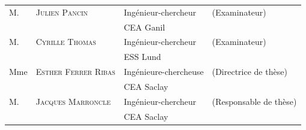 \begin{titlepage}
\begin{textblock}{14}
\begin{center}
\begin{tabular}{llll}
        M.    & \textsc{Julien Pancin}       & Ingénieur-chercheur     & (Examinateur)          \\
        \null & \null                        & CEA Ganil               &                        \\
        M.    & \textsc{Cyrille Thomas}      & Ingénieur-chercheur     & (Examinateur)          \\
        \null & \null                        & ESS Lund                &                        \\ 				
        Mme   & \textsc{Esther Ferrer Ribas} & Ingénieure-chercheuse   & (Directrice de thèse)  \\
        \null & \null                        & CEA Saclay              &                        \\ 
        
        M.    & \textsc{Jacques Marroncle}   & Ingénieur-chercheur     & (Responsable de thèse) \\
        \null & \null                        & CEA Saclay              &                        \\ 		
      \end{tabular}
    \end{center}
  \end{textblock}
\end{titlepage}